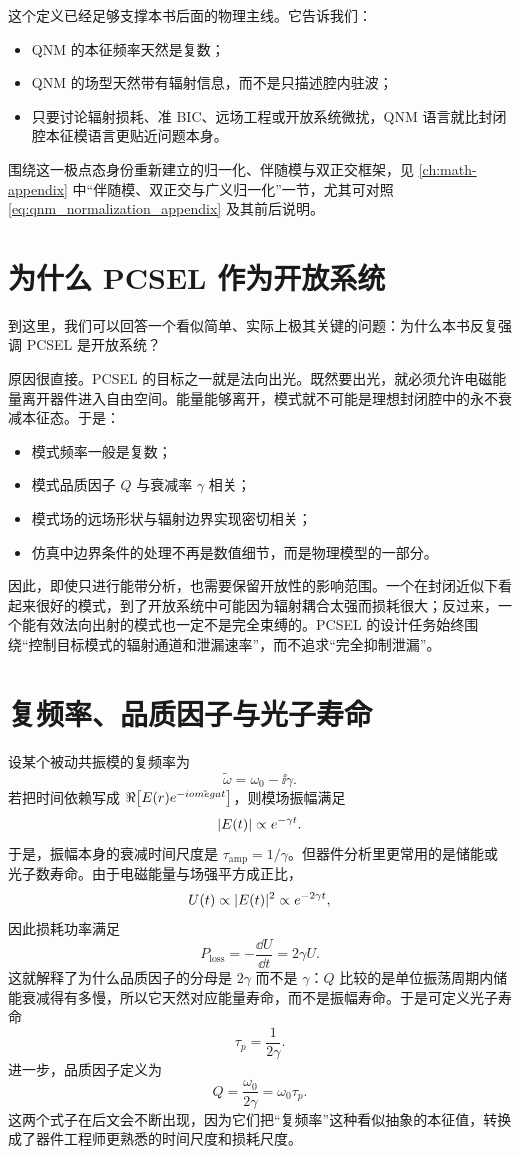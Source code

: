 这个定义已经足够支撑本书后面的物理主线。它告诉我们：
\begin{itemize}
  \item QNM 的本征频率天然是复数；
  \item QNM 的场型天然带有辐射信息，而不是只描述腔内驻波；
  \item 只要讨论辐射损耗、准 BIC、远场工程或开放系统微扰，QNM 语言就比封闭腔本征模语言更贴近问题本身。
\end{itemize}
围绕这一极点态身份重新建立的归一化、伴随模与双正交框架，见 \cref{ch:math-appendix} 中“伴随模、双正交与广义归一化”一节，尤其可对照 \cref{eq:qnm_normalization_appendix} 及其前后说明。

\section{为什么 PCSEL 作为开放系统}
到这里，我们可以回答一个看似简单、实际上极其关键的问题：为什么本书反复强调 PCSEL 是开放系统？

原因很直接。PCSEL 的目标之一就是法向出光。既然要出光，就必须允许电磁能量离开器件进入自由空间。能量能够离开，模式就不可能是理想封闭腔中的永不衰减本征态。于是：
\begin{itemize}
  \item 模式频率一般是复数；
  \item 模式品质因子 $Q$ 与衰减率 $\gamma$ 相关；
  \item 模式场的远场形状与辐射边界实现密切相关；
  \item 仿真中边界条件的处理不再是数值细节，而是物理模型的一部分。
\end{itemize}

因此，即使只进行能带分析，也需要保留开放性的影响范围。一个在封闭近似下看起来很好的模式，到了开放系统中可能因为辐射耦合太强而损耗很大；反过来，一个能有效法向出射的模式也一定不是完全束缚的。PCSEL 的设计任务始终围绕“控制目标模式的辐射通道和泄漏速率”，而不追求“完全抑制泄漏”。

\section{复频率、品质因子与光子寿命}
设某个被动共振模的复频率为
\[
\tilde{\omega}=\omega_0-\ii\gamma.
\]
若把时间依赖写成 $\Re\!\left[E(r)e^{-i\tilde{omega} t}\right]$，则模场振幅满足
\[
|E(t)|\propto e^{-\gamma t}.
\]
于是，振幅本身的衰减时间尺度是 $\tau_{\mathrm{amp}}=1/\gamma$。但器件分析里更常用的是储能或光子数寿命。由于电磁能量与场强平方成正比，
\[
U(t)\propto |E(t)|^2\propto e^{-2\gamma t},
\]
因此损耗功率满足
\[
P_{\mathrm{loss}}=-\frac{\dd U}{\dd t}=2\gamma U.
\]
这就解释了为什么品质因子的分母是 $2\gamma$ 而不是 $\gamma$：$Q$ 比较的是单位振荡周期内储能衰减得有多慢，所以它天然对应能量寿命，而不是振幅寿命。于是可定义光子寿命
\begin{equation}
\tau_p=\frac{1}{2\gamma}.
\label{eq:photon_lifetime}
\end{equation}
进一步，品质因子定义为
\begin{equation}
Q=\frac{\omega_0}{2\gamma}=\omega_0\tau_p.
\label{eq:q_def}
\end{equation}
这两个式子在后文会不断出现，因为它们把“复频率”这种看似抽象的本征值，转换成了器件工程师更熟悉的时间尺度和损耗尺度。

